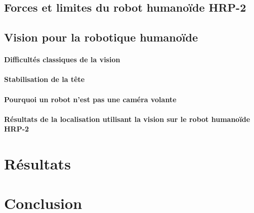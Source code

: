 \subsection{Forces et limites du robot humanoïde HRP-2}
\subsection{Vision pour la robotique humanoïde}
\paragraph{Difficultés classiques de la vision}
\paragraph{Stabilisation de la tête}
\paragraph{Pourquoi un robot n'est pas une caméra volante}
\paragraph{Résultats de la localisation utilisant la vision sur le robot humanoïde HRP-2}

\section{Résultats}

\section{Conclusion}
